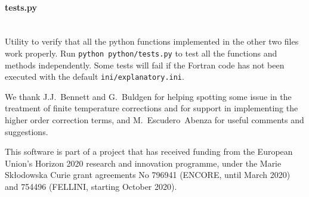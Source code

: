 \documentclass[notitlepage,showpacs,preprintnumbers,amsmath,amssymb,superscriptaddress,prd,onecolumn]{revtex4-1}
\begin{document}
\smallskip
\paragraph{tests.py}~\\
Utility to verify that all the python functions implemented in the other two files work properly.
Run \texttt{python python/tests.py} to test all the functions and methods independently.
Some tests will fail if the Fortran code has not been executed
with the default \texttt{ini/explanatory.ini}.




\acknowledgments
We thank J.J.~Bennett and G.~Buldgen for helping spotting
some issue in the treatment of finite temperature corrections
and for support in implementing the higher order correction terms,
and M.~Escudero~Abenza for useful comments and suggestions.

This software is part of a project that has received funding from the European Union's Horizon 2020 research and innovation programme, under the Marie Sk{\l}odowska Curie grant agreements No
796941 (ENCORE, until March 2020) and
754496 (FELLINI, starting October 2020).




\end{document}
